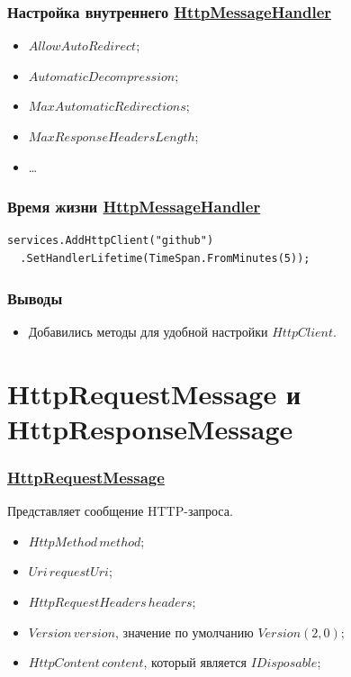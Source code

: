 \documentclass[17pt,aspectratio=169]{beamer}
\begin{document}
\begin{frame}[fragile]
\frametitle{Настройка внутреннего \href{https://docs.microsoft.com/en-us/dotnet/api/system.net.http.socketshttphandler?view=netcore-2.2}{HttpMessageHandler}}
\begin{itemize}
	\item $AllowAutoRedirect$;
	\item $AutomaticDecompression$;
	\item $MaxAutomaticRedirections$;
	\item $MaxResponseHeadersLength$;
	\item \ldots
\end{itemize}
\end{frame}

\begin{frame}[fragile]
\frametitle{Время жизни \href{https://docs.microsoft.com/en-us/dotnet/api/system.net.http.socketshttphandler?view=netcore-2.2}{HttpMessageHandler}}
\begin{lstlisting}
services.AddHttpClient("github")
  .SetHandlerLifetime(TimeSpan.FromMinutes(5));
\end{lstlisting}
\end{frame}

\begin{frame}
\frametitle{Выводы}
\begin{itemize}
	\item Добавились методы для удобной настройки $HttpClient$.
\end{itemize}
\end{frame}


\section{HttpRequestMessage и HttpResponseMessage}
\begin{frame}
\frametitle{\href{https://docs.microsoft.com/en-us/dotnet/api/system.net.http.httprequestmessage?view=netcore-2.2}{HttpRequestMessage}}
Представляет сообщение HTTP-запроса. 
\begin{itemize}
	\item $HttpMethod\,method$;
	\item $Uri\,requestUri$;
	\item $HttpRequestHeaders\,headers$;
	\item $Version\,version$, значение по умолчанию $Version(2, 0)$;
	\item $HttpContent\,content$, который является $IDisposable$;
\end{itemize}
\end{frame}
\end{document}
